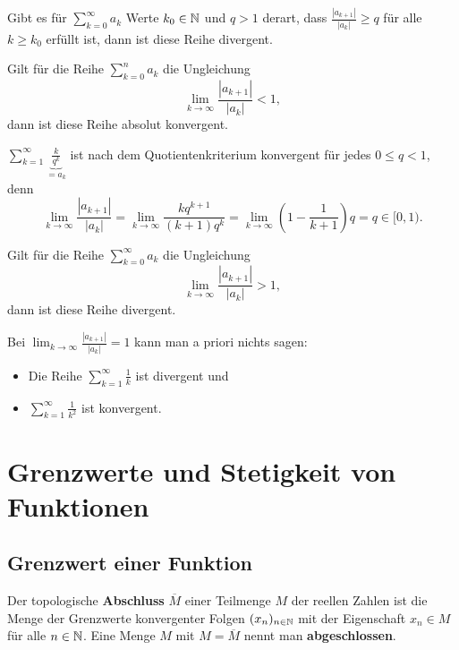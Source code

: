\begin{thm} 
	Gibt es für $\sum_{k=0}^\infty a_k$  Werte $k_0 \in \mathbb{N}$ und $q> 1$ derart, dass $\frac{|a_{k+1}|}{|a_k|} \ge q$ für alle $k \ge k_0$ erfüllt ist, dann ist diese Reihe divergent. 
\end{thm} 

\begin{thm}
	Gilt für die Reihe $\sum_{k=0}^n a_k$ die Ungleichung 
	\[
		\lim_{k \to \infty} \frac{|a_{k+1}|}{|a_k|} < 1,
	\]
	dann ist diese Reihe absolut konvergent. 
\end{thm} 

\begin{bsp}
	$\sum_{k=1}^\infty \underbrace{ \frac{k}{q^k} }_{=a_k}$ ist nach dem Quotientenkriterium konvergent für jedes $0 \le q < 1$, denn
	\[
		\lim_{k \to \infty} \frac{|a_{k+1}|}{|a_k|} = \lim_{k \to \infty} \frac{k q^{k+1}}{(k+1) q^k } = \lim_{k \to \infty} \left( 1 - \frac{1}{k+1} \right) q = q \in [0,1).
	\]
\end{bsp} 

\begin{thm}
	Gilt für die Reihe $\sum_{k=0}^\infty a_k$ die Ungleichung 
	\[
	\lim_{k \to \infty} \frac{|a_{k+1}|}{|a_k|} > 1,
	\]
	dann ist diese Reihe divergent. 
\end{thm} 

\begin{bem}
	Bei $\lim_{k \to \infty} \frac{|a_{k+1}|}{|a_k|} =1$ kann man a priori nichts sagen: 
	\begin{itemize}
		\item[] Die Reihe $\sum_{k=1}^\infty \frac{1}{k}$ ist divergent und 
		\item[] $\sum_{k=1}^\infty \frac{1}{k^2}$ ist konvergent. 
	\end{itemize} 
\end{bem} 

\chapter{Grenzwerte und Stetigkeit von Funktionen} 

\section{Grenzwert einer Funktion} 

\begin{defn}
	Der topologische \textbf{Abschluss} $\overline{M}$ einer Teilmenge $M$ der reellen Zahlen ist die Menge der Grenzwerte konvergenter Folgen $(x_n)_{n \in \mathbb{N}}$ mit der Eigenschaft $x_n \in M$ für alle $n \in \mathbb{N}$. Eine Menge $M$ mit $M = \overline{M}$ nennt man \textbf{abgeschlossen}. 
\end{defn} 

